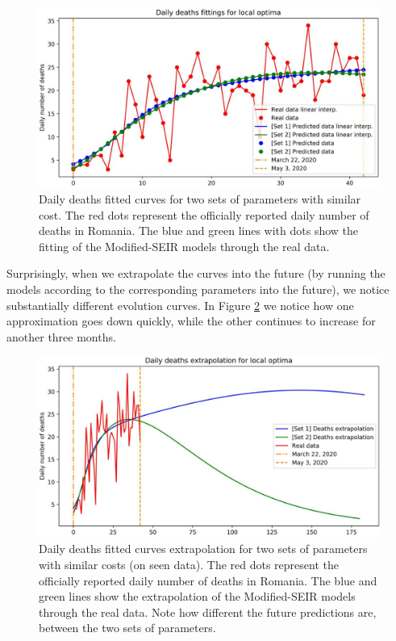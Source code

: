 \documentclass[11pt]{article}
\begin{document}
\newpage

\begin{figure}[H]
  \centering
  \includegraphics[width=0.8\linewidth]{figs/comparison/05-03-deaths_fitting.pdf}
  \caption{Daily deaths fitted curves for two sets of parameters with similar cost. The red dots represent the officially reported daily number of deaths in Romania. The blue and green lines with dots show the fitting of the Modified-SEIR models through the real data.}
  \label{fig:compare-daily-deaths}
\end{figure}

Surprisingly, when we extrapolate the curves into the future (by running the models according to the corresponding parameters into the future), we notice substantially different evolution curves. In Figure \ref{fig:compare-daily-deaths-extrapolation} we notice how one approximation goes down quickly, while the other continues to increase for another three months.

\begin{figure}[H]
  \centering
  \includegraphics[width=0.8\linewidth]{figs/comparison/05-03-deaths_extrapolation.pdf}
  \caption{Daily deaths fitted curves extrapolation for two sets of parameters with similar costs (on seen data). The red dots represent the officially reported daily number of deaths in Romania. The blue and green lines show the extrapolation of the Modified-SEIR models through the real data. Note how different the future predictions are, between the two sets of parameters.}
  \label{fig:compare-daily-deaths-extrapolation}
\end{figure}
\end{document}
